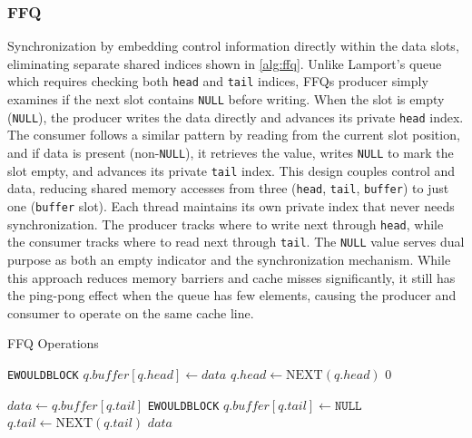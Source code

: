 \subsubsection{\acl{FFQ}}
Synchronization by embedding control information directly within the data slots, eliminating separate shared indices shown in \cref{alg:ffq}. Unlike Lamport's queue which requires checking both \texttt{head} and \texttt{tail} indices, \acsp{FFQ} producer simply examines if the next slot contains \texttt{NULL} before writing. When the slot is empty (\texttt{NULL}), the producer writes the data directly and advances its private \texttt{head} index. The consumer follows a similar pattern by reading from the current slot position, and if data is present (non-\texttt{NULL}), it retrieves the value, writes \texttt{NULL} to mark the slot empty, and advances its private \texttt{tail} index. This design couples control and data, reducing shared memory accesses from three (\texttt{head}, \texttt{tail}, \texttt{buffer}) to just one (\texttt{buffer} slot). Each thread maintains its own private index that never needs synchronization. The producer tracks where to write next through \texttt{head}, while the consumer tracks where to read next through \texttt{tail}. The \texttt{NULL} value serves dual purpose as both an empty indicator and the synchronization mechanism. While this approach reduces memory barriers and cache misses significantly, it still has the ping-pong effect when the queue has few elements, causing the producer and consumer to operate on the same cache line. \cite{ffq} 

\begin{algorithm}[!ht]
    \centering
    \captionsetup{justification=centering}
    \caption{\acl{FFQ} Operations \cite{ffq}}
    \label{alg:ffq}
    \scriptsize
    \begin{algorithmic}[1]
                \State \Return \texttt{EWOULDBLOCK}
            \EndIf
            \State $q.buffer[q.head] \gets data$
            \State $q.head \gets \text{NEXT}(q.head)$
            \State \Return $0$
        \EndFunction
        
        \State
        
            \State $data \gets q.buffer[q.tail]$
                \State \Return \texttt{EWOULDBLOCK}
            \EndIf
            \State $q.buffer[q.tail] \gets \texttt{NULL}$
            \State $q.tail \gets \text{NEXT}(q.tail)$
            \State \Return $data$
        \EndFunction
    \end{algorithmic}
 \end{algorithm}

